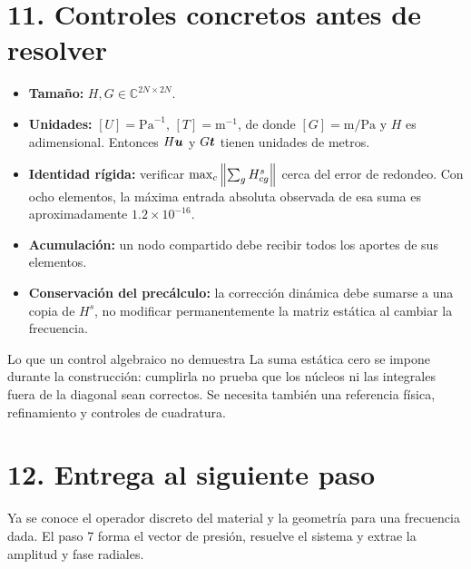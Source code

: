\documentclass[11pt]{article}
\begin{document}
\section*{11. Controles concretos antes de resolver}
\begin{itemize}
 \item \textbf{Tamaño:} \(H,G\in\mathbb C^{2N\times2N}\).
 \item \textbf{Unidades:}
 \([U]=\mathrm{Pa}^{-1}\), \([T]=\mathrm m^{-1}\), de donde
 \([G]=\mathrm{m/Pa}\) y \(H\) es adimensional.
 Entonces \(H\bm{u}\) y \(G\bm{t}\) tienen unidades de metros.
 \item \textbf{Identidad rígida:} verificar
 \(\max_c\left\lVert\sum_gH^s_{cg}\right\rVert\) cerca del error de redondeo.
 Con ocho elementos, la máxima entrada absoluta observada de esa suma
 es aproximadamente \(1.2\times10^{-16}\).
 \item \textbf{Acumulación:} un nodo compartido debe recibir todos los
 aportes de sus elementos.
 \item \textbf{Conservación del precálculo:} la corrección dinámica debe
 sumarse a una copia de \(H^s\), no modificar permanentemente la matriz
 estática al cambiar la frecuencia.
\end{itemize}
\begin{idea}{Lo que un control algebraico no demuestra}
La suma estática cero se impone durante la construcción: cumplirla no prueba
que los núcleos ni las integrales fuera de la diagonal sean correctos.
Se necesita también una referencia física, refinamiento y controles de
cuadratura.
\end{idea}
\section*{12. Entrega al siguiente paso}
Ya se conoce el operador discreto del material y la geometría para una
frecuencia dada. El paso 7 forma el vector de presión, resuelve el sistema
y extrae la amplitud y fase radiales.
\fuentes
\end{document}
